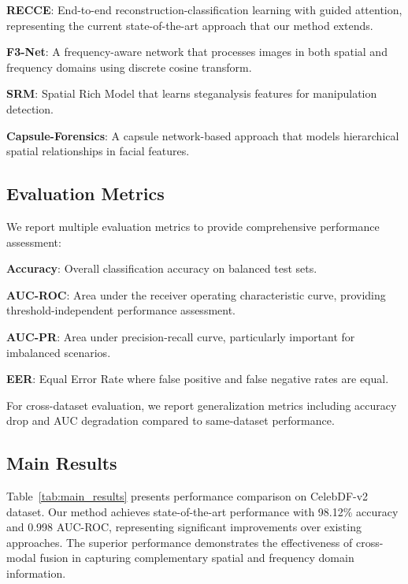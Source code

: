 \documentclass[letterpaper]{article} %
\begin{document}
\textbf{RECCE}: End-to-end reconstruction-classification learning with guided attention, representing the current state-of-the-art approach that our method extends.

\textbf{F3-Net}: A frequency-aware network that processes images in both spatial and frequency domains using discrete cosine transform.

\textbf{SRM}: Spatial Rich Model that learns steganalysis features for manipulation detection.

\textbf{Capsule-Forensics}: A capsule network-based approach that models hierarchical spatial relationships in facial features.

\subsection{Evaluation Metrics}

We report multiple evaluation metrics to provide comprehensive performance assessment:

\textbf{Accuracy}: Overall classification accuracy on balanced test sets.

\textbf{AUC-ROC}: Area under the receiver operating characteristic curve, providing threshold-independent performance assessment.

\textbf{AUC-PR}: Area under precision-recall curve, particularly important for imbalanced scenarios.

\textbf{EER}: Equal Error Rate where false positive and false negative rates are equal.

For cross-dataset evaluation, we report generalization metrics including accuracy drop and AUC degradation compared to same-dataset performance.

\subsection{Main Results}

Table~\ref{tab:main_results} presents performance comparison on CelebDF-v2 dataset. Our method achieves state-of-the-art performance with 98.12\% accuracy and 0.998 AUC-ROC, representing significant improvements over existing approaches. The superior performance demonstrates the effectiveness of cross-modal fusion in capturing complementary spatial and frequency domain information.
\end{document}
